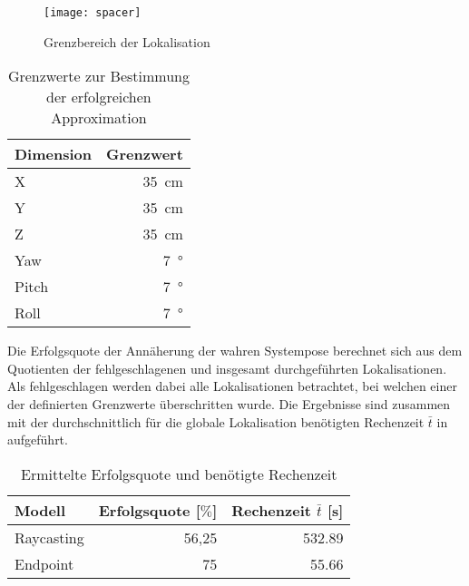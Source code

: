 \begin{figure}[!ht]
	\begin{center}
		\texttt{[image: spacer]}
		\caption{Grenzbereich der Lokalisation}
		\label{fig.loclimits}
	\end{center}
\end{figure}

\begin{table}[ht]
	\centering
	\caption{Grenzwerte zur Bestimmung der erfolgreichen Approximation}
	\label{tab.thresh_glob}
	\vspace*{-3mm}
	\begin{tabular}[ht]{|l|r|}\hline
		\rowcolor{Snow2}
		Dimension		& Grenzwert 					\\ \hline
		X				& \SI{35}{\centi\meter}		\\ \hline		
		Y				& \SI{35}{\centi\meter}		\\ \hline
		Z				& \SI{35}{\centi\meter}		\\ \hline
		Yaw				& \SI{7}{°}					\\ \hline
		Pitch			& \SI{7}{°}					\\ \hline
		Roll 			& \SI{7}{°}					\\ \hline
	\end{tabular} 
	\vspace*{-3mm}
\end{table}

Die Erfolgsquote der Annäherung der wahren Systempose berechnet sich aus dem Quotienten der fehlgeschlagenen und insgesamt durchgeführten Lokalisationen. Als fehlgeschlagen werden dabei alle Lokalisationen betrachtet, bei welchen einer der definierten Grenzwerte überschritten wurde. Die Ergebnisse sind zusammen mit der durchschnittlich für die globale Lokalisation benötigten Rechenzeit $\bar{t}$ in  aufgeführt.

\begin{table}[ht]
	\centering
	\caption{Ermittelte Erfolgsquote und benötigte Rechenzeit}
	\label{tab.approx_time}
	\vspace*{-3mm}
	\begin{tabular}[ht]{|l|r|r|}\hline
		\rowcolor{Snow2}
		Modell			& Erfolgsquote [$\%$]	&	Rechenzeit $\bar{t}$	 [s]	\\ \hline
		Raycasting		& 56,25					&	\SI{532,89}{}			\\ \hline		
		Endpoint			& 75					&	\SI{55,66}{}			\\ \hline
	\end{tabular} 
	\vspace*{-3mm}
\end{table}

